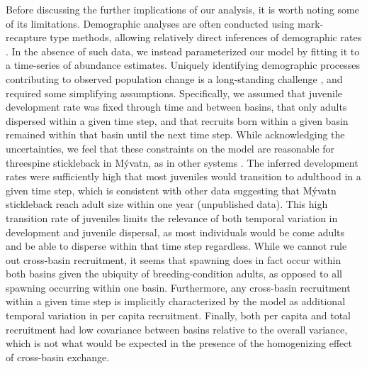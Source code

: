 \documentclass[11pt]{article}
\begin{document}
{Before discussing the further implications of our analysis, 
it is worth noting some of its limitations. 
Demographic analyses are often conducted using mark-recapture type methods,
allowing relatively direct inferences of demographic rates
\citep{lebreton1992, fujiwara2002}.
In the absence of such data, 
we instead parameterized our model by fitting it to a time-series of abundance estimates.
Uniquely identifying demographic processes 
contributing to observed population change is a long-standing challenge 
\citep{wood1994, twombly1994},
and required some simplifying assumptions.
Specifically, 
we assumed that juvenile development rate was fixed through time and between basins,
that only adults dispersed within a given time step,
and that recruits born within a given basin remained within that basin until the next time step.
While acknowledging the uncertainties,
we feel that these constraints on the model are reasonable for 
threespine stickleback in M\'{y}vatn,
as in other systems \citep{yurtseva2019}.
The inferred development rates were sufficiently high that most juveniles would transition 
to adulthood in a given time step,
which is consistent with other data suggesting that M\'{y}vatn stickleback
reach adult size within one year (unpublished data).
This high transition rate of juveniles
limits the relevance of both temporal variation in development and juvenile dispersal,
as most individuals would be come adults and be able to disperse within that time step 
regardless.
While we cannot rule out cross-basin recruitment, 
it seems that spawning does in fact occur within both basins given the ubiquity 
of breeding-condition adults, 
as opposed to all spawning occurring within one basin.
Furthermore, any cross-basin recruitment within a given time step 
is implicitly characterized by the model as additional temporal variation in
per capita recruitment.
Finally, both per capita and total recruitment had low covariance between basins relative
to the overall variance, which is not what would be expected in the presence of 
the homogenizing effect of cross-basin exchange. 

}
\end{document}
